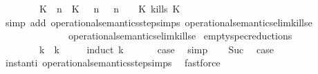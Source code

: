 \begin{isabellebody}
\ \ \ \ \ \ \ \ {\isacharparenleft}{\isacharparenleft}K\ {\isasymUp}\ n{\isacharparenright}\ {\isacharhash}\ {\isacharparenleft}K\ {\isasymnot}{\isasymUp}\ {\isasymge}\ n{\isacharparenright}\ {\isacharhash}\ {\isasymGamma}{\isacharparenright}{\isacharcomma}\ n\ {\isasymturnstile}\ {\isasymPsi}\ {\isasymtriangleright}\ {\isacharparenleft}{\isacharparenleft}K\ kills\ K\ {\isacharhash}\ {\isasymPhi}{\isacharparenright}\ {\isacharbraceright}{\isacartoucheclose}\isanewline
%
\isadelimproof
%
\endisadelimproof
%
\isatagproof
{}\isamarkupfalse%
\ {\isacharparenleft}simp\ add{\isacharcolon}\ operational{\isacharunderscore}semantics{\isacharunderscore}step{\isachardot}simps\ operational{\isacharunderscore}semantics{\isacharunderscore}elim{\isachardot}kills{\isacharunderscore}e{}\isanewline
\ \ \ \ \ \ \ \ \ \ \ \ \ \ operational{\isacharunderscore}semantics{\isacharunderscore}elim{\isachardot}kills{\isacharunderscore}e{}{\isacharparenright}%
\endisatagproof
{\isafoldproof}%
%
\isadelimproof
\isanewline
%
\endisadelimproof
\isanewline
{}\isamarkupfalse%
\ empty{\isacharunderscore}spec{\isacharunderscore}reductions{\isacharcolon}\isanewline
\ \ {\isacartoucheopen}{\isacharparenleft}{\isacharbrackleft}{\isacharbrackright}{\isacharcomma}\ {}\ {\isasymturnstile}\ {\isacharbrackleft}{\isacharbrackright}\ {\isasymtriangleright}\ {\isacharbrackleft}{\isacharbrackright}{\isacharparenright}\ {\isasymhookrightarrow}\isactrlbsup k\isactrlesup \ {\isacharparenleft}{\isacharbrackleft}{\isacharbrackright}{\isacharcomma}\ k\ {\isasymturnstile}\ {\isacharbrackleft}{\isacharbrackright}\ {\isasymtriangleright}\ {\isacharbrackleft}{\isacharbrackright}{\isacharparenright}{\isacartoucheclose}\isanewline
%
\isadelimproof
%
\endisadelimproof
%
\isatagproof
{}\isamarkupfalse%
\ {\isacharparenleft}induct\ k{\isacharparenright}\isanewline
\ \ \isamarkupfalse%
\ {}\ \isamarkupfalse%
\ {\isacharquery}case\ \isamarkupfalse%
\ simp\isanewline
{}\isamarkupfalse%
\isanewline
\ \ \isamarkupfalse%
\ Suc\ \isamarkupfalse%
\ {\isacharquery}case\isanewline
\ \ \ \ \isamarkupfalse%
\ instant{\isacharunderscore}i\ operational{\isacharunderscore}semantics{\isacharunderscore}step{\isachardot}simps\ \isamarkupfalse%
\ fastforce\ \isanewline
{}\isamarkupfalse%
%
\endisatagproof
{\isafoldproof}%
%
\isadelimproof
\isanewline
%
\endisadelimproof
%
\isadelimtheory
\isanewline
%
\endisadelimtheory
%
\isatagtheory
{}\isamarkupfalse%
%
\endisatagtheory
{\isafoldtheory}%
%
\isadelimtheory
%
\endisadelimtheory
%
\end{isabellebody}%
